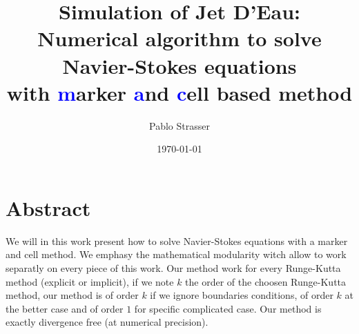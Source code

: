 \documentclass[a4paper]{master}
\title{Simulation of Jet D'Eau:\\ Numerical algorithm to solve Navier-Stokes equations\\
with \textcolor{blue}{m}arker \textcolor{blue}{a}nd \textcolor{blue}{c}ell based method}
\author{Pablo Strasser}
\date{\today}
\begin{document}
\captionsetup{singlelinecheck=off,margin=10pt,font=small,labelfont=bf}
\maketitle
\dominitoc

\chapter*{Abstract}

\mtcaddchapter[Abstract]

We will in this work present how to solve Navier-Stokes equations with a marker and cell method.
We emphasy the mathematical modularity witch allow to work separatly on every piece of this work.
Our method work for every Runge-Kutta method (explicit or implicit), if we note $k$ the order of the choosen Runge-Kutta method,
our method is of order $k$ if we ignore boundaries conditions, of order $k$ at the better case and of order $1$ for specific complicated case.
Our method is exactly divergence free (at numerical precision).
\tableofcontents





\end{document}
